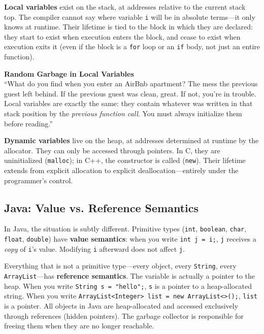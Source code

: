 \textbf{Local variables} exist on the stack, at addresses relative to the current stack top. The compiler cannot say where variable \texttt{i} will be in absolute terms---it only knows at runtime. Their lifetime is tied to the block in which they are declared: they start to exist when execution enters the block, and cease to exist when execution exits it (even if the block is a \texttt{for} loop or an \texttt{if} body, not just an entire function).

\begin{insightbox}
\textbf{Random Garbage in Local Variables} \\
``What do you find when you enter an AirBnb apartment? The mess the previous guest left behind. If the previous guest was clean, great. If not, you're in trouble. Local variables are exactly the same: they contain whatever was written in that stack position by the \emph{previous function call}. You must always initialize them before reading.''
\end{insightbox}

\textbf{Dynamic variables} live on the heap, at addresses determined at runtime by the allocator. They can only be accessed through pointers. In C, they are uninitialized (\texttt{malloc}); in C++, the constructor is called (\texttt{new}). Their lifetime extends from explicit allocation to explicit deallocation---entirely under the programmer's control.

\subsection{Java: Value vs. Reference Semantics}

In Java, the situation is subtly different. Primitive types (\texttt{int}, \texttt{boolean}, \texttt{char}, \texttt{float}, \texttt{double}) have \textbf{value semantics}: when you write \texttt{int j = i;}, \texttt{j} receives a \emph{copy} of \texttt{i}'s value. Modifying \texttt{i} afterward does not affect \texttt{j}.

Everything that is not a primitive type---every object, every \texttt{String}, every \texttt{ArrayList}---has \textbf{reference semantics}. The variable is actually a pointer to the heap. When you write \texttt{String s = "hello";}, \texttt{s} is a pointer to a heap-allocated string. When you write \texttt{ArrayList<Integer> list = new ArrayList<>();}, \texttt{list} is a pointer. All objects in Java are heap-allocated and accessed exclusively through references (hidden pointers). The garbage collector is responsible for freeing them when they are no longer reachable.

